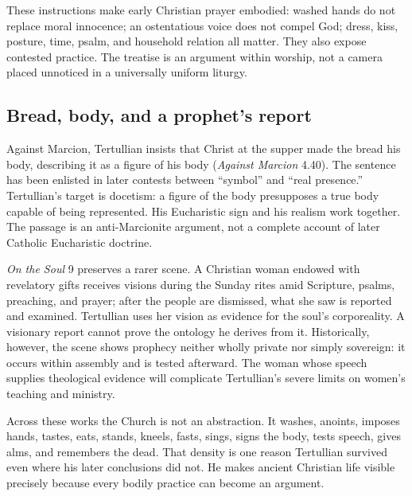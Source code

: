 These instructions make early Christian prayer embodied: washed hands do not
replace moral innocence; an ostentatious voice does not compel God; dress,
kiss, posture, time, psalm, and household relation all matter. They also expose
contested practice. The treatise is an argument within worship, not a camera
placed unnoticed in a universally uniform liturgy.

\subsection{Bread, body, and a prophet's report}

Against Marcion, Tertullian insists that Christ at the supper made the bread his
body, describing it as a figure of his body (\emph{Against Marcion} 4.40). The
sentence has been enlisted in later contests between ``symbol'' and ``real
presence.'' Tertullian's target is docetism: a figure of the body presupposes a
true body capable of being represented. His Eucharistic sign and his realism
work together. The passage is an anti-Marcionite argument, not a complete
account of later Catholic Eucharistic doctrine.

\emph{On the Soul} 9 preserves a rarer scene. A Christian woman endowed with
revelatory gifts receives visions during the Sunday rites amid Scripture,
psalms, preaching, and prayer; after the people are dismissed, what she saw is
reported and examined. Tertullian uses her vision as evidence for the soul's
corporeality. A visionary report cannot prove the ontology he derives from it.
Historically, however, the scene shows prophecy neither wholly private nor
simply sovereign: it occurs within assembly and is tested afterward. The woman
whose speech supplies theological evidence will complicate Tertullian's severe
limits on women's teaching and ministry.

Across these works the Church is not an abstraction. It washes, anoints,
imposes hands, tastes, eats, stands, kneels, fasts, sings, signs the body, tests
speech, gives alms, and remembers the dead. That density is one reason
Tertullian survived even where his later conclusions did not. He makes ancient
Christian life visible precisely because every bodily practice can become an
argument.
